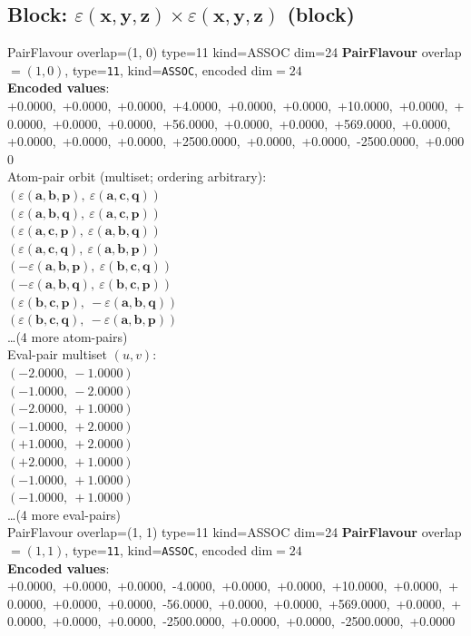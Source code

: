\documentclass[a4paper,11pt]{article}
\newcommand{\kblbmcpggoncpf}[3]{\varepsilon(\mathbf{#1},\mathbf{#2},\mathbf{#3})}
\begin{document}
\subsection{Block: $\kblbmcpggoncpf{x}{y}{z} \times \kblbmcpggoncpf{x}{y}{z}$  (block)}
    PairFlavour  overlap=(1, 0)  type=11  kind=ASSOC  dim=24
\textbf{PairFlavour} overlap$=(1, 0)$, type=\texttt{11}, kind=\texttt{ASSOC}, encoded dim$=24$\\
\textbf{      Encoded values}: +0.0000,\ +0.0000,\ +0.0000,\ +4.0000,\ +0.0000,\ +0.0000,\ +10.0000,\ +0.0000,\ +0.0000,\ +0.0000,\ +0.0000,\ +56.0000,\ +0.0000,\ +0.0000,\ +569.0000,\ +0.0000,\ +0.0000,\ +0.0000,\ +0.0000,\ +2500.0000,\ +0.0000,\ +0.0000,\ -2500.0000,\ +0.0000\\
\quad Atom-pair orbit (multiset; ordering arbitrary):\\
$(\kblbmcpggoncpf{a}{b}{p},\ \kblbmcpggoncpf{a}{c}{q})$\\
$(\kblbmcpggoncpf{a}{b}{q},\ \kblbmcpggoncpf{a}{c}{p})$\\
$(\kblbmcpggoncpf{a}{c}{p},\ \kblbmcpggoncpf{a}{b}{q})$\\
$(\kblbmcpggoncpf{a}{c}{q},\ \kblbmcpggoncpf{a}{b}{p})$\\
$(-\kblbmcpggoncpf{a}{b}{p},\ \kblbmcpggoncpf{b}{c}{q})$\\
$(-\kblbmcpggoncpf{a}{b}{q},\ \kblbmcpggoncpf{b}{c}{p})$\\
$(\kblbmcpggoncpf{b}{c}{p},\ -\kblbmcpggoncpf{a}{b}{q})$\\
$(\kblbmcpggoncpf{b}{c}{q},\ -\kblbmcpggoncpf{a}{b}{p})$\\
\quad \ldots (4 more atom-pairs)\\
\quad Eval-pair multiset $(u, v)$:\\
$(-2.0000,\ -1.0000)$\\
$(-1.0000,\ -2.0000)$\\
$(-2.0000,\ +1.0000)$\\
$(-1.0000,\ +2.0000)$\\
$(+1.0000,\ +2.0000)$\\
$(+2.0000,\ +1.0000)$\\
$(-1.0000,\ +1.0000)$\\
$(-1.0000,\ +1.0000)$\\
\quad \ldots (4 more eval-pairs)\\
    PairFlavour  overlap=(1, 1)  type=11  kind=ASSOC  dim=24
\textbf{PairFlavour} overlap$=(1, 1)$, type=\texttt{11}, kind=\texttt{ASSOC}, encoded dim$=24$\\
\textbf{      Encoded values}: +0.0000,\ +0.0000,\ +0.0000,\ -4.0000,\ +0.0000,\ +0.0000,\ +10.0000,\ +0.0000,\ +0.0000,\ +0.0000,\ +0.0000,\ -56.0000,\ +0.0000,\ +0.0000,\ +569.0000,\ +0.0000,\ +0.0000,\ +0.0000,\ +0.0000,\ -2500.0000,\ +0.0000,\ +0.0000,\ -2500.0000,\ +0.0000\\
\end{document}
